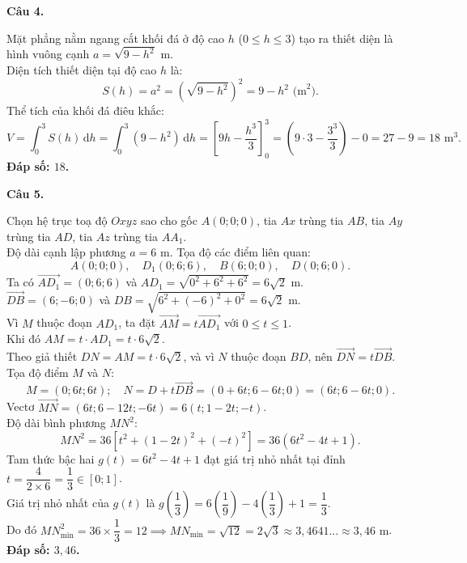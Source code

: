 \documentclass[12pt,a4paper]{article}
\newcommand{\loigiai}[1]{\par\medskip\Needspace{4\baselineskip}\noindent\textbf{#1}\par\nobreak}
\begin{document}
\loigiai{Câu 4.}
Mặt phẳng nằm ngang cắt khối đá ở độ cao $h$ ($0 \le h \le 3$) tạo ra thiết diện là hình vuông cạnh $a = \sqrt{9 - h^2}\text{ m}$.\\
Diện tích thiết diện tại độ cao $h$ là:
$$S(h) = a^2 = \left(\sqrt{9 - h^2}\right)^2 = 9 - h^2\text{ (m}^2).$$
Thể tích của khối đá điêu khắc:
$$V = \int_0^3 S(h)\,\mathrm{d}h = \int_0^3 (9 - h^2)\,\mathrm{d}h = \left[9h - \dfrac{h^3}{3}\right]_0^3 = \left(9 \cdot 3 - \dfrac{3^3}{3}\right) - 0 = 27 - 9 = 18\text{ m}^3.$$
\textbf{Đáp số: $18$.}

\loigiai{Câu 5.}
Chọn hệ trục toạ độ $Oxyz$ sao cho gốc $A(0; 0; 0)$, tia $Ax$ trùng tia $AB$, tia $Ay$ trùng tia $AD$, tia $Az$ trùng tia $AA_1$.\\
Độ dài cạnh lập phương $a = 6\text{ m}$. Tọa độ các điểm liên quan:
$$A(0; 0; 0),\quad D_1(0; 6; 6),\quad B(6; 0; 0),\quad D(0; 6; 0).$$
Ta có $\vec{AD_1} = (0; 6; 6)$ và $AD_1 = \sqrt{0^2 + 6^2 + 6^2} = 6\sqrt{2}\text{ m}$.\\
$\vec{DB} = (6; -6; 0)$ và $DB = \sqrt{6^2 + (-6)^2 + 0^2} = 6\sqrt{2}\text{ m}$.\\
Vì $M$ thuộc đoạn $AD_1$, ta đặt $\vec{AM} = t \vec{AD_1}$ với $0 \le t \le 1$.\\
Khi đó $AM = t \cdot AD_1 = t \cdot 6\sqrt{2}$.\\
Theo giả thiết $DN = AM = t \cdot 6\sqrt{2}$, và vì $N$ thuộc đoạn $BD$, nên $\vec{DN} = t \vec{DB}$.\\
Tọa độ điểm $M$ và $N$:
$$M = (0; 6t; 6t);\quad N = D + t\vec{DB} = (0 + 6t; 6 - 6t; 0) = (6t; 6 - 6t; 0).$$
Vectơ $\vec{MN} = (6t; 6 - 12t; -6t) = 6(t; 1 - 2t; -t)$.\\
Độ dài bình phương $MN^2$:
$$MN^2 = 36 \left[ t^2 + (1 - 2t)^2 + (-t)^2 \right] = 36(6t^2 - 4t + 1).$$
Tam thức bậc hai $g(t) = 6t^2 - 4t + 1$ đạt giá trị nhỏ nhất tại đỉnh $t = \dfrac{4}{2 \times 6} = \dfrac{1}{3} \in [0; 1]$.\\
Giá trị nhỏ nhất của $g(t)$ là $g\left(\dfrac{1}{3}\right) = 6\left(\dfrac{1}{9}\right) - 4\left(\dfrac{1}{3}\right) + 1 = \dfrac{1}{3}$.\\
Do đó $MN_{\min}^2 = 36 \times \dfrac{1}{3} = 12 \implies MN_{\min} = \sqrt{12} = 2\sqrt{3} \approx 3{,}4641... \approx 3{,}46\text{ m}$.\\
\textbf{Đáp số: $3{,}46$.}
\end{document}
